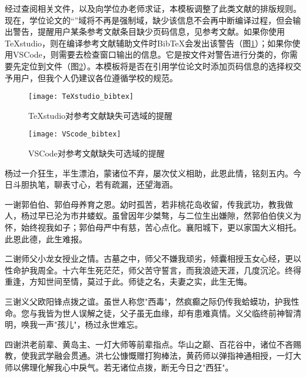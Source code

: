 \documentclass[doctor, vlined]{DissertUESTC}
\begin{document}
\begin{itemize}
		经过查阅相关文件，以及向学位办老师求证，本模板调整了此类文献的排版规则。现在，学位论文的“”域将不再是强制域，缺少该信息不会再中断编译过程，但会输出警告，提醒用户某条参考文献条目缺少页码信息，见参考文献\cite{陈念永2001毫米波细胞生物效应及抗肿瘤研究无页码}。如果你使用TeXstudio，则在编译参考文献辅助文件时BibTeX会发出该警告（图\ref{fig: TeXstudio对参考文献缺失信息的提醒}）；如果你使用VSCode，则需要去检查窗口输出的信息。它是按文件对警告进行分类的，你需要先定位到文件（图\ref{fig: VSCode对参考文献缺失信息的提醒}）。本模板将是否在引用学位论文时添加页码信息的选择权交予用户，但我个人仍建议各位遵循学校的规范。
	\end{itemize}
	
	\begin{figure}[!h]
		\centering
		\texttt{[image: TeXstudio\_bibtex]}
		\caption{TeXstudio对参考文献缺失可选域的提醒} \label{fig: TeXstudio对参考文献缺失信息的提醒}
	\end{figure}
	\begin{figure}[!h]
		\centering
		\texttt{[image: VScode\_bibtex]}
		\caption{VSCode对参考文献缺失可选域的提醒} \label{fig: VSCode对参考文献缺失信息的提醒}
	\end{figure}
	
	\acknowledgement
	

	杨过一介狂生，半生漂泊，蒙诸位不弃，屡次仗义相助，此恩此情，铭刻五内。今日斗胆执笔，聊表寸心，若有疏漏，还望海涵。

	一谢郭伯伯、郭伯母养育之恩。幼时孤苦，若非桃花岛收留，传我武功，教我做人，杨过早已沦为市井蝼蚁。虽曾因年少桀骜，与二位生出嫌隙，然郭伯伯侠义为怀，始终视我如子；郭伯母严中有慈，苦心点化。襄阳城下，更以家国大义相托。此恩此德，此生难报。

	二谢师父小龙女授业之情。古墓之中，师父不嫌我顽劣，倾囊相授玉女心经，更以性命护我周全。十六年生死茫茫，师父苦守誓言，而我浪迹天涯，几度沉沦。终得重逢，方知世间至情，莫过于此。师徒之名，夫妻之实，此生无悔。

	三谢义父欧阳锋点拨之谊。虽世人称您"西毒"，然疯癫之际仍传我蛤蟆功，护我性命。您与我皆为世人误解之徒，父子虽无血缘，却有患难真情。义父临终前神智清明，唤我一声"孩儿"，杨过永世难忘。

	四谢洪老前辈、黄岛主、一灯大师等前辈指点。华山之巅、百花谷中，诸位不吝赐教，使我武学融会贯通。洪七公慷慨赠打狗棒法，黄药师以弹指神通相授，一灯大师以佛理化解我心中戾气。若无诸位点拨，断无今日之"西狂"。
\end{document}

